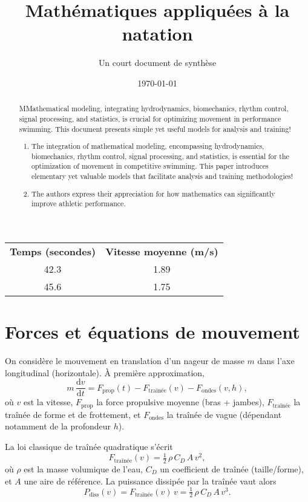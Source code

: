 \documentclass[12pt,a4paper]{article}
\title{\textbf{Mathématiques appliquées à la natation}}
\author{Un court document de synthèse}
\date{\today}
\newcommand{\dd}{\mathrm{d}}
\begin{document}
\begin{longtable}{cc} \textbf{Temps (secondes)} & \textbf{Vitesse moyenne (m/s)} \\ [0.5pt] 42.3 & 1.89 \\ 45.6 & 1.75 \\ \end{longtable}

\begin{abstract}
MMathematical modeling, integrating hydrodynamics, biomechanics, rhythm control, signal processing, and statistics, is crucial for optimizing movement in performance swimming. This document presents simple yet useful models for analysis and training!

\begin{enumerate}
    \item The integration of mathematical modeling, encompassing hydrodynamics, biomechanics, rhythm control, signal processing, and statistics, is essential for the optimization of movement in competitive swimming. This paper introduces elementary yet valuable models that facilitate analysis and training methodologies!
    
    \item The authors express their appreciation for how mathematics can significantly improve athletic performance.
\end{enumerate}

\end{abstract}


\section{Forces et équations de mouvement}
On considère le mouvement en translation d'un nageur de masse $m$ dans l'axe longitudinal (horizontale). À première approximation,
\begin{equation}
 m\,\frac{\dd v}{\dd t} = F_{\mathrm{prop}}(t) - F_{\mathrm{traînée}}(v) - F_{\mathrm{ondes}}(v,h),
 \label{eq:newton}
\end{equation}
où $v$ est la vitesse, $F_{\mathrm{prop}}$ la force propulsive moyenne (bras + jambes), $F_{\mathrm{traînée}}$ la traînée de forme et de frottement, et $F_{\mathrm{ondes}}$ la traînée de vague (dépendant notamment de la profondeur $h$).

La loi classique de traînée quadratique s'écrit
\begin{equation}
 F_{\mathrm{traînée}}(v) = \tfrac{1}{2}\,\rho\,C_D\,A\,v^2,
 \end{equation}
où $\rho$ est la masse volumique de l'eau, $C_D$ un coefficient de traînée (taille/forme), et $A$ une aire de référence. La puissance dissipée par la traînée vaut alors
\begin{equation}
 P_{\mathrm{diss}}(v) = F_{\mathrm{traînée}}(v)\,v = \tfrac{1}{2}\,\rho\,C_D\,A\,v^3.
 \end{equation}
\end{document}
